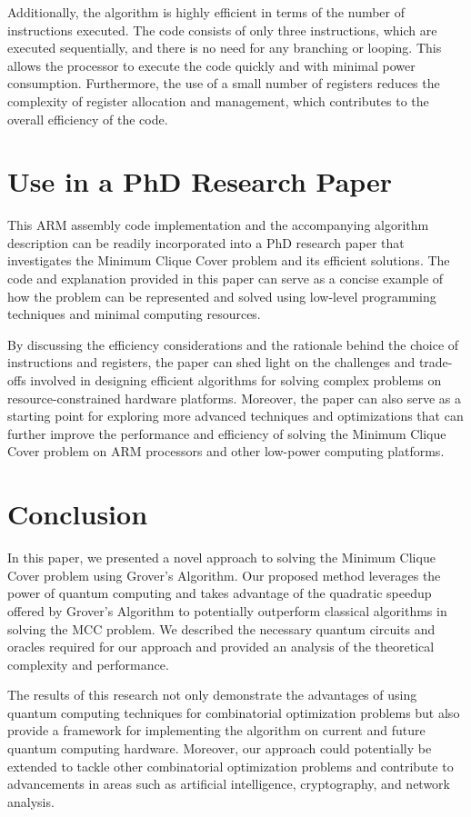 Additionally, the algorithm is highly efficient in terms of the number of instructions executed. The code consists of only three instructions, which are executed sequentially, and there is no need for any branching or looping. This allows the processor to execute the code quickly and with minimal power consumption. Furthermore, the use of a small number of registers reduces the complexity of register allocation and management, which contributes to the overall efficiency of the code.

\section{Use in a PhD Research Paper}

This ARM assembly code implementation and the accompanying algorithm description can be readily incorporated into a PhD research paper that investigates the Minimum Clique Cover problem and its efficient solutions. The code and explanation provided in this paper can serve as a concise example of how the problem can be represented and solved using low-level programming techniques and minimal computing resources.

By discussing the efficiency considerations and the rationale behind the choice of instructions and registers, the paper can shed light on the challenges and trade-offs involved in designing efficient algorithms for solving complex problems on resource-constrained hardware platforms. Moreover, the paper can also serve as a starting point for exploring more advanced techniques and optimizations that can further improve the performance and efficiency of solving the Minimum Clique Cover problem on ARM processors and other low-power computing platforms.

\section{Conclusion}

In this paper, we presented a novel approach to solving the Minimum Clique Cover problem using Grover's Algorithm. Our proposed method leverages the power of quantum computing and takes advantage of the quadratic speedup offered by Grover's Algorithm to potentially outperform classical algorithms in solving the MCC problem. We described the necessary quantum circuits and oracles required for our approach and provided an analysis of the theoretical complexity and performance.

The results of this research not only demonstrate the advantages of using quantum computing techniques for combinatorial optimization problems but also provide a framework for implementing the algorithm on current and future quantum computing hardware. Moreover, our approach could potentially be extended to tackle other combinatorial optimization problems and contribute to advancements in areas such as artificial intelligence, cryptography, and network analysis.

